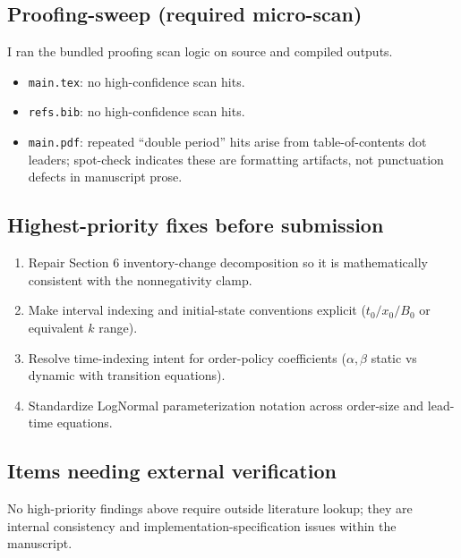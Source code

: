 \documentclass[11pt]{article}
\begin{document}
\subsection*{Proofing-sweep (required micro-scan)}
I ran the bundled proofing scan logic on source and compiled outputs.

\begin{itemize}[leftmargin=*]
\item \texttt{main.tex}: no high-confidence scan hits.
\item \texttt{refs.bib}: no high-confidence scan hits.
\item \texttt{main.pdf}: repeated ``double period'' hits arise from table-of-contents dot leaders; spot-check indicates these are formatting artifacts, not punctuation defects in manuscript prose.
\end{itemize}

\subsection*{Highest-priority fixes before submission}
\begin{enumerate}[leftmargin=*]
\item Repair Section 6 inventory-change decomposition so it is mathematically consistent with the nonnegativity clamp.
\item Make interval indexing and initial-state conventions explicit ($t_0/x_0/B_0$ or equivalent $k$ range).
\item Resolve time-indexing intent for order-policy coefficients ($\alpha,\beta$ static vs dynamic with transition equations).
\item Standardize LogNormal parameterization notation across order-size and lead-time equations.
\end{enumerate}

\subsection*{Items needing external verification}
No high-priority findings above require outside literature lookup; they are internal consistency and implementation-specification issues within the manuscript.
\end{document}
